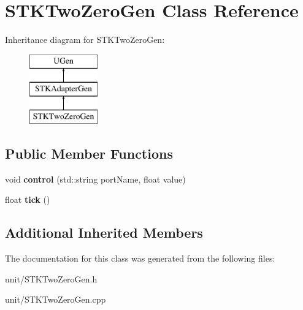\hypertarget{classSTKTwoZeroGen}{}\section{S\+T\+K\+Two\+Zero\+Gen Class Reference}
\label{classSTKTwoZeroGen}
Inheritance diagram for S\+T\+K\+Two\+Zero\+Gen\+:\begin{figure}[H]
\begin{center}
\leavevmode
\includegraphics[height=3.000000cm]{classSTKTwoZeroGen}
\end{center}
\end{figure}
\subsection*{Public Member Functions}
\begin{DoxyCompactItemize}
\item 
void {\bfseries control} (std\+::string port\+Name, float value)\hypertarget{classSTKTwoZeroGen_a35f0458e31142985a3f35b603ff90e62}{}\label{classSTKTwoZeroGen_a35f0458e31142985a3f35b603ff90e62}

\item 
float {\bfseries tick} ()\hypertarget{classSTKTwoZeroGen_a1e9392a2e8dc67862de802e914acbf33}{}\label{classSTKTwoZeroGen_a1e9392a2e8dc67862de802e914acbf33}

\end{DoxyCompactItemize}
\subsection*{Additional Inherited Members}


The documentation for this class was generated from the following files\+:\begin{DoxyCompactItemize}
\item 
unit/S\+T\+K\+Two\+Zero\+Gen.\+h\item 
unit/S\+T\+K\+Two\+Zero\+Gen.\+cpp\end{DoxyCompactItemize}
